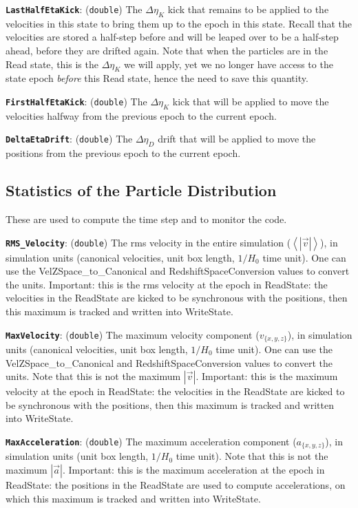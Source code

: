 \documentclass[11pt,preprint]{aastex}
\newcommand{\param}[2]{\medskip\noindent\textbf{\texttt{#1}}: ({\tt #2}) }
\begin{document}
\param{LastHalfEtaKick}{double} The $\Delta\eta_K$ kick that remains
to be applied to the velocities in this state to bring them up to
the epoch in this state.  Recall that the velocities are stored a 
half-step before and will be leaped over to be a half-step ahead, 
before they are drifted again.  Note that when the particles are in
the Read state, this is the $\Delta\eta_K$ we will apply, yet we 
no longer have access to the state epoch {\it before} this Read state,
hence the need to save this quantity.

\param{FirstHalfEtaKick}{double} The $\Delta\eta_K$ kick that will
be applied to move the velocities halfway from the previous epoch
to the current epoch.

\param{DeltaEtaDrift}{double} The $\Delta\eta_D$ drift that will
be applied to move the positions from the previous epoch
to the current epoch.

\subsection{Statistics of the Particle Distribution}
These are used to compute the time step and to monitor the code.

\param{RMS\_Velocity}{double}
The rms velocity in the entire simulation ($\left<|\vec{v}|\right>$),
in simulation units (canonical velocities, unit box length, $1/H_0$
time unit).  One can use the VelZSpace\_to\_Canonical and
RedshiftSpaceConversion values to convert the units.  Important:
this is the rms velocity at the epoch in ReadState: the velocities
in the ReadState are kicked to be synchronous with the positions,
then this maximum is tracked and written into WriteState.

\param{MaxVelocity}{double} The maximum velocity component
($v_{\{x,y,z\}}$), in simulation units (canonical velocities, unit
box length, $1/H_0$ time unit).  One can use the VelZSpace\_to\_Canonical
and RedshiftSpaceConversion values to convert the units.  Note that
this is not the maximum $|\vec{v}|$.  Important: this is the maximum
velocity at the epoch in ReadState: the velocities in the ReadState
are kicked to be synchronous with the positions, then this maximum
is tracked and written into WriteState.

\param{MaxAcceleration}{double} The maximum acceleration component
($a_{\{x,y,z\}}$), in simulation units (unit box length, $1/H_0$
time unit).  Note that this is not the maximum $|\vec{a}|$.  Important:
this is the maximum acceleration at the epoch in ReadState: the
positions in the ReadState are used to compute accelerations, on
which this maximum is tracked and written into WriteState.
\end{document}
